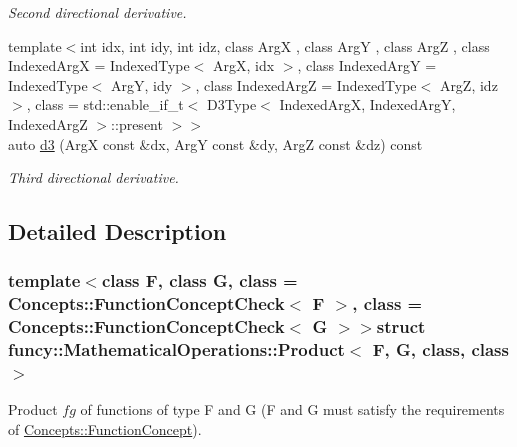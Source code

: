 \begin{DoxyCompactItemize}
\begin{DoxyCompactList}\small\item\em Second directional derivative. \end{DoxyCompactList}\item 
{\footnotesize template$<$int idx, int idy, int idz, class Arg\-X , class Arg\-Y , class Arg\-Z , class Indexed\-Arg\-X  = Indexed\-Type$<$ Arg\-X, idx $>$, class Indexed\-Arg\-Y  = Indexed\-Type$<$ Arg\-Y, idy $>$, class Indexed\-Arg\-Z  = Indexed\-Type$<$ Arg\-Z, idz $>$, class  = std\-::enable\-\_\-if\-\_\-t$<$                           D3\-Type$<$ Indexed\-Arg\-X, Indexed\-Arg\-Y, Indexed\-Arg\-Z $>$\-::present $>$$>$ }\\auto \hyperlink{structfuncy_1_1MathematicalOperations_1_1Product_af9b3dfcefb7a6fb2c8fdcfbf612da77f}{d3} (Arg\-X const \&dx, Arg\-Y const \&dy, Arg\-Z const \&dz) const 
\begin{DoxyCompactList}\small\item\em Third directional derivative. \end{DoxyCompactList}\end{DoxyCompactItemize}


\subsection{Detailed Description}
\subsubsection*{template$<$class F, class G, class = Concepts\-::\-Function\-Concept\-Check$<$ F $>$, class = Concepts\-::\-Function\-Concept\-Check$<$ G $>$$>$struct funcy\-::\-Mathematical\-Operations\-::\-Product$<$ F, G, class, class $>$}

Product $fg$ of functions of type F and G (F and G must satisfy the requirements of \hyperlink{structfuncy_1_1Concepts_1_1FunctionConcept}{Concepts\-::\-Function\-Concept}). 

